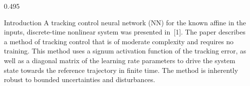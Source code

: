 \documentclass[final]{beamer}
\newlength{\postergap}      \setlength{\postergap}{0.7cm}
\newlength{\rowAh}          \setlength{\rowAh}{13.1cm}
\begin{document}
\begin{frame}[t]
\begin{center}
\begin{minipage}{0.975\textwidth}
\begin{minipage}[t][\rowAh]{\linewidth}
\begin{columns}[T,totalwidth=\linewidth]
\begin{column}{0.495\linewidth}
\begin{posterpanel}[height=\rowAh]{Introduction}
							A tracking control neural network (NN) for the known affine in the
							inputs, discrete-time nonlinear system was presented in~[1]. The paper
							describes a method of tracking control that is of moderate complexity
							and requires no training. This method uses a signum activation function
							of the tracking error, as well as a diagonal matrix of the learning rate
							parameters to drive the system state towards the reference trajectory in
							finite time. The method is inherently robust to bounded uncertainties
							and disturbances.
						\end{posterpanel}
					\end{column}
				\end{columns}
			\end{minipage}

			\vspace{\postergap}


\end{minipage}
\end{center}
\end{frame}
\end{document}
